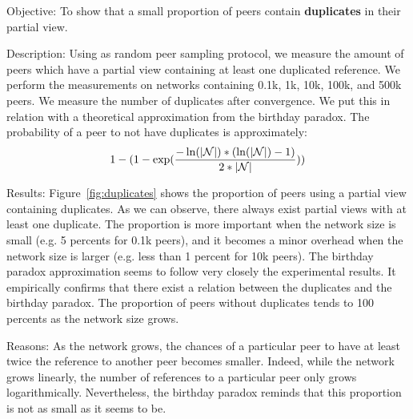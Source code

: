 \begin{asparadesc} 
\item[Objective:] To show that a small proportion of peers contain
  \textbf{duplicates} in their partial view.
\item[Description:] Using \SCAMP as random peer sampling protocol, we measure
  the amount of peers which have a partial view containing at least one
  duplicated reference. We perform the measurements on networks containing
  0.1k, 1k, 10k, 100k, and 500k peers. We measure the number of duplicates
  after convergence. We put this in relation with a theoretical approximation
  from the birthday paradox. The probability of a peer to not have duplicates
  is approximately:
  \begin{equation}
    1- 
    (1-
    \exp({-\ln(|\mathcal{N}|)*(\ln(|\mathcal{N}|)-1)\over{2*|\mathcal{N}|}}))
  \end{equation}
\item[Results:] Figure~\ref{fig:duplicates} shows the proportion of peers using
  a partial view containing duplicates. As we can observe, there always exist
  partial views with at least one duplicate. The proportion is more important
  when the network size is small (e.g. 5 percents for 0.1k peers), and it
  becomes a minor overhead when the network size is larger (e.g. less than 1
  percent for 10k peers). The birthday paradox approximation seems to follow
  very closely the experimental results. It empirically confirms that there
  exist a relation between the duplicates and the birthday paradox. The
  proportion of peers without duplicates tends to 100 percents as the network
  size grows.
\item[Reasons:] As the network grows, the chances of a particular peer to have
  at least twice the reference to another peer becomes smaller. Indeed, while
  the network grows linearly, the number of references to a particular peer
  only grows logarithmically. Nevertheless, the birthday paradox reminds that
  this proportion is not as small as it seems to be.
\end{asparadesc}



